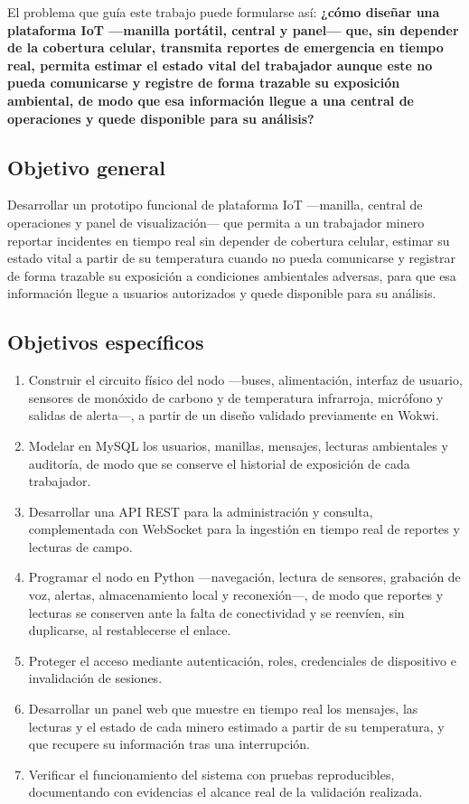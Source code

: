 \documentclass[10pt,a4paper]{article}
\begin{document}
El problema que guía este trabajo puede formularse así: \textbf{¿cómo diseñar una plataforma IoT —manilla portátil, central y panel— que, sin depender de la cobertura celular, transmita reportes de emergencia en tiempo real, permita estimar el estado vital del trabajador aunque este no pueda comunicarse y registre de forma trazable su exposición ambiental, de modo que esa información llegue a una central de operaciones y quede disponible para su análisis?}

\subsection{Objetivo general}
Desarrollar un prototipo funcional de plataforma IoT —manilla, central de operaciones y panel de visualización— que permita a un trabajador minero reportar incidentes en tiempo real sin depender de cobertura celular, estimar su estado vital a partir de su temperatura cuando no pueda comunicarse y registrar de forma trazable su exposición a condiciones ambientales adversas, para que esa información llegue a usuarios autorizados y quede disponible para su análisis.

\subsection{Objetivos específicos}
\begin{enumerate}
\item Construir el circuito físico del nodo —buses, alimentación, interfaz de usuario, sensores de monóxido de carbono y de temperatura infrarroja, micrófono y salidas de alerta—, a partir de un diseño validado previamente en Wokwi.
\item Modelar en MySQL los usuarios, manillas, mensajes, lecturas ambientales y auditoría, de modo que se conserve el historial de exposición de cada trabajador.
\item Desarrollar una API REST para la administración y consulta, complementada con WebSocket para la ingestión en tiempo real de reportes y lecturas de campo.
\item Programar el nodo en Python —navegación, lectura de sensores, grabación de voz, alertas, almacenamiento local y reconexión—, de modo que reportes y lecturas se conserven ante la falta de conectividad y se reenvíen, sin duplicarse, al restablecerse el enlace.
\item Proteger el acceso mediante autenticación, roles, credenciales de dispositivo e invalidación de sesiones.
\item Desarrollar un panel web que muestre en tiempo real los mensajes, las lecturas y el estado de cada minero estimado a partir de su temperatura, y que recupere su información tras una interrupción.
\item Verificar el funcionamiento del sistema con pruebas reproducibles, documentando con evidencias el alcance real de la validación realizada.
\end{enumerate}
\end{document}
